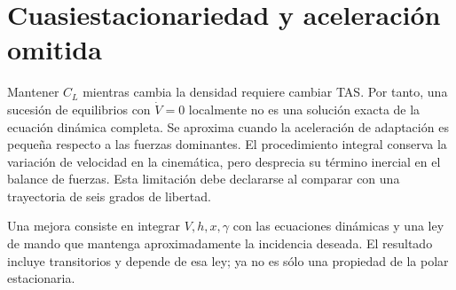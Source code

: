\section{Cuasiestacionariedad y aceleración omitida}
Mantener $C_L$ mientras cambia la densidad requiere cambiar TAS. Por tanto, una sucesión de equilibrios con $\dot V=0$ localmente no es una solución exacta de la ecuación dinámica completa. Se aproxima cuando la aceleración de adaptación es pequeña respecto a las fuerzas dominantes. El procedimiento integral conserva la variación de velocidad en la cinemática, pero desprecia su término inercial en el balance de fuerzas. Esta limitación debe declararse al comparar con una trayectoria de seis grados de libertad.

Una mejora consiste en integrar $V,h,x,\gamma$ con las ecuaciones dinámicas y una ley de mando que mantenga aproximadamente la incidencia deseada. El resultado incluye transitorios y depende de esa ley; ya no es sólo una propiedad de la polar estacionaria.



